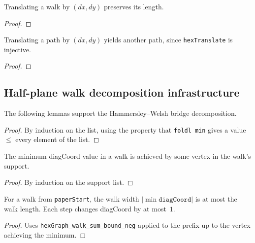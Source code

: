 \begin{lemma}
\begin{enumerate}
\begin{lemma}\label{lem:translate-length}
\leanok
  Translating a walk by $(dx, dy)$ preserves its length.
\end{lemma}
\begin{proof}\leanok\end{proof}

\begin{lemma}\label{lem:translate-path}
\leanok
  Translating a path by $(dx, dy)$ yields another path,
  since \texttt{hexTranslate} is injective.
\end{lemma}
\begin{proof}\leanok\end{proof}

\subsection{Half-plane walk decomposition infrastructure}

The following lemmas support the Hammersley--Welsh bridge decomposition.

\begin{proof}\leanok
  By induction on the list, using the property that \texttt{foldl min}
  gives a value $\leq$ every element of the list.
\end{proof}

\begin{lemma}\label{lem:walk-min-dc-achieved}
\leanok
  The minimum diagCoord value in a walk is achieved by some vertex
  in the walk's support.
\end{lemma}
\begin{proof}\leanok
  By induction on the support list.
\end{proof}

\begin{lemma}\label{lem:walk-width-le}
\leanok
  For a walk from \texttt{paperStart}, the walk width
  $|\min \texttt{diagCoord}|$ is at most the walk length.
  Each step changes diagCoord by at most~$1$.
\end{lemma}
\begin{proof}\leanok
  Uses \texttt{hexGraph\_walk\_sum\_bound\_neg} applied to the prefix
  up to the vertex achieving the minimum.
\end{proof}


\end{enumerate}
\end{lemma}

